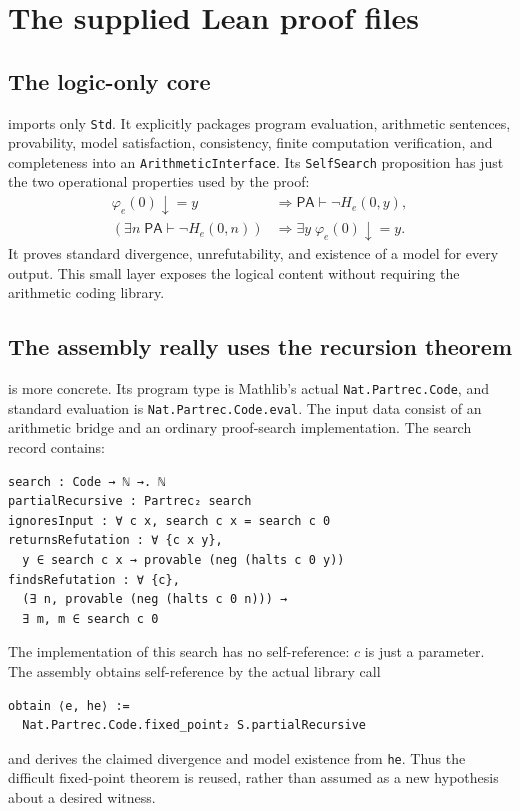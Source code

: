\documentclass[11pt]{article}
\newcommand{\PA}{\mathsf{PA}}
\theoremstyle{definition}
\theoremstyle{remark}
\begin{document}
\section{The supplied Lean proof files}

\subsection{The logic-only core}

 imports only \texttt{Std}. It explicitly
packages program evaluation, arithmetic sentences, provability, model
satisfaction, consistency, finite computation verification, and
completeness into an \texttt{ArithmeticInterface}. Its
\texttt{SelfSearch} proposition has just the two operational properties
used by the proof:
\begin{align*}
 \varphi_e(0)\downarrow=y
   &\Longrightarrow \PA\vdash\neg H_e(0,y),\\
 (\exists n\;\PA\vdash\neg H_e(0,n))
   &\Longrightarrow \exists y\;\varphi_e(0)\downarrow=y.
\end{align*}
It proves standard divergence, unrefutability, and existence of a model
for every output. This small layer exposes the logical content without
requiring the arithmetic coding library.

\subsection{The assembly really uses the recursion theorem}

 is more concrete. Its program type is
Mathlib's actual \texttt{Nat.Partrec.Code}, and standard evaluation is
\texttt{Nat.Partrec.Code.eval}. The input data consist of an arithmetic
bridge and an ordinary proof-search implementation. The search record
contains:
\begin{lstlisting}
search : Code → ℕ →. ℕ
partialRecursive : Partrec₂ search
ignoresInput : ∀ c x, search c x = search c 0
returnsRefutation : ∀ {c x y},
  y ∈ search c x → provable (neg (halts c 0 y))
findsRefutation : ∀ {c},
  (∃ n, provable (neg (halts c 0 n))) →
  ∃ m, m ∈ search c 0
\end{lstlisting}
The implementation of this search has no self-reference: $c$ is just a
parameter. The assembly obtains self-reference by the actual library
call
\begin{lstlisting}
obtain ⟨e, he⟩ :=
  Nat.Partrec.Code.fixed_point₂ S.partialRecursive
\end{lstlisting}
and derives the claimed divergence and model existence from
\texttt{he}. Thus the difficult fixed-point theorem is reused, rather
than assumed as a new hypothesis about a desired witness.
\end{document}
